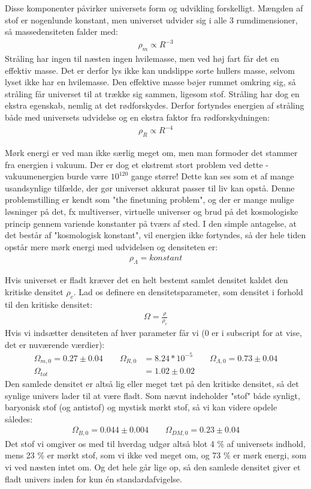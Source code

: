 Disse komponenter påvirker universets form og udvikling forskelligt. Mængden af stof er nogenlunde konstant, men universet udvider sig i alle 3 rumdimensioner, så massedensiteten falder med:
\begin{align}
	\rho_m \propto R^{-3}
\end{align}
Stråling har ingen til næsten ingen hvilemasse, men ved høj fart får det en effektiv masse. Det er derfor lys ikke kan undslippe sorte hullers masse, selvom lyset ikke har en hvilemasse. Den effektive masse bøjer rummet omkring sig, så stråling får universet til at trække sig sammen, ligesom stof. Stråling har dog en ekstra egenskab, nemlig at det rødforskydes. Derfor fortyndes energien af stråling både med universets udvidelse og en ekstra faktor fra rødforskydningen:
\begin{align}
	\rho_R\propto R^{-4}
\end{align}

Mørk energi er ved man ikke særlig meget om, men man formoder det stammer fra energien i vakuum. Der er dog et ekstremt stort problem ved dette - vakuumenergien burde være $10^{120}$ gange større! Dette kan ses som et af mange usandsynlige tilfælde, der gør universet akkurat passer til liv kan opstå. Denne problemstilling er kendt som "the finetuning problem", og der er mange mulige løsninger på det, fx multiverser, virtuelle universer og brud på det kosmologiske princip gennem variende konstanter på tværs af sted. %
I den simple antagelse, at det består af "kosmologisk konstant", vil energien ikke fortyndes, så der hele tiden opstår mere mørk energi med udvidelsen og densiteten er:
\begin{align}
	\rho_\Lambda = konstant
\end{align}

Hvis universet er fladt kræver det en helt bestemt samlet densitet kaldet den kritiske densitet $\rho_c$. Lad os definere en densitetsparameter, som densitet i forhold til den kritiske densitet:
\begin{align}
	\Omega=\frac{\rho}{\rho_c}
\end{align}
Hvis vi indsætter densiteten af hver parameter får vi (0 er i subscript for at vise, det er nuværende værdier):
\begin{align}
	\Omega_{m,0}=0.27\pm 0.04\qquad
	\Omega_{R,0}&=8.24*10^{-5}\qquad
	\Omega_{\Lambda,0}=0.73\pm 0.04\\
	\Omega_{tot}&=1.02\pm 0.02
\end{align}
Den samlede densitet er altså lig eller meget tæt på den kritiske densitet, så det synlige univers lader til at være fladt. Som nævnt indeholder "stof"  både synligt, baryonisk stof (og antistof) og mystisk mørkt stof, så vi kan videre opdele således:
\begin{align}
\Omega_{B,0}=0.044\pm 0.004\qquad
\Omega_{DM,0}=0.23\pm 0.04
\end{align}
Det stof vi omgiver os med til hverdag udgør altså blot 4 \% af universets indhold, mens 23 \% er mørkt stof, som vi ikke ved meget om, og 73 \% er mørk energi, som vi ved næsten intet om. Og det hele går lige op, så den samlede densitet giver et fladt univers inden for kun én standardafvigelse.

